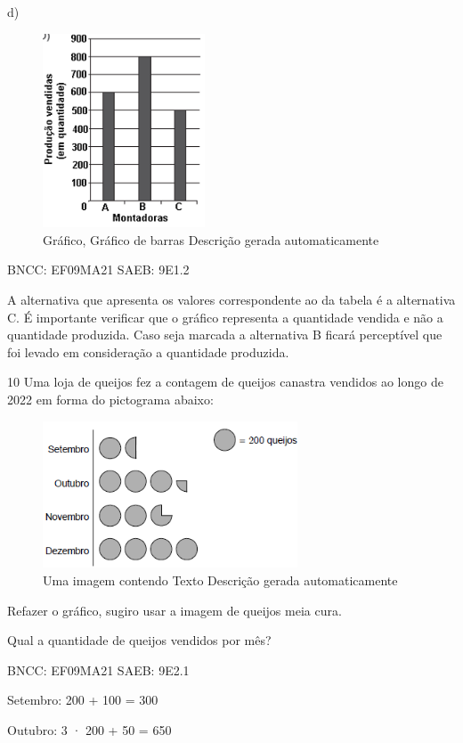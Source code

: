 \begin{escolha}
{{{\begin{escolha}
{{{{{\begin{escolha}
\begin{escolha}
{\begin{q°}
d)

\begin{figure}
\centering
\includegraphics[width=1.89183in,height=2.26686in]{./_SAEB_9_MAT/media/image222.png}
\caption{Gráfico, Gráfico de barras Descrição gerada automaticamente}
\end{figure}

BNCC: EF09MA21 SAEB: 9E1.2

A alternativa que apresenta os valores correspondente ao da tabela é a
alternativa C. É importante verificar que o gráfico representa a
quantidade vendida e não a quantidade produzida. Caso seja marcada a
alternativa B ficará perceptível que foi levado em consideração a
quantidade produzida.

\num{10} Uma loja de queijos fez a contagem de queijos canastra vendidos ao
longo de 2022 em forma do pictograma abaixo:

\begin{figure}
\centering
\includegraphics[width=2.97917in,height=1.71639in]{./_SAEB_9_MAT/media/image223.png}
\caption{Uma imagem contendo Texto Descrição gerada automaticamente}
\end{figure}

Refazer o gráfico, sugiro usar a imagem de queijos meia cura.

Qual a quantidade de queijos vendidos por mês?

BNCC: EF09MA21 SAEB: 9E2.1

Setembro: 200 + 100 = 300

Outubro: 3 · 200 + 50 = 650


\end{q°}}
\end{escolha}
\end{escolha}}}}}}
\end{escolha}}}}
\end{escolha}
